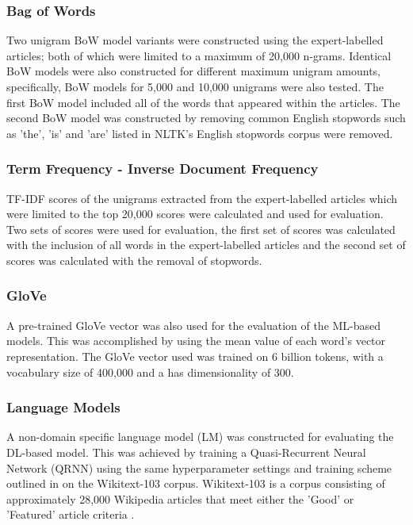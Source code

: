 \documentclass[a4paper,twoside,phd]{BYUPhys}
\begin{document}
\subsubsection{Bag of Words}
\label{sec:FeatureSelectionBoW}
Two unigram BoW model variants were constructed using the expert-labelled articles; both of which were limited to a maximum of 20,000 n-grams. Identical BoW models were also constructed for different maximum unigram amounts, specifically, BoW models for 5,000 and 10,000 unigrams were also tested. The first BoW model included all of the words that appeared within the articles. The second BoW model was constructed by removing common English stopwords such as 'the', 'is' and 'are' listed in NLTK's English stopwords corpus \cite{Bird2009} were removed.

\subsubsection{Term Frequency - Inverse Document Frequency}
\label{sec:FeatureSelectionTFIDF}
TF-IDF scores of the unigrams extracted from the expert-labelled articles which were limited to the top 20,000 scores were calculated and used for evaluation. Two sets of scores were used for evaluation, the first set of scores was calculated with the inclusion of all words in the expert-labelled articles and the second set of scores was calculated with the removal of stopwords.

\subsubsection{GloVe}
\label{sec:FeatureSelectionGloVe}

A pre-trained GloVe vector \cite{pennington2014glove} was also used for the evaluation of the ML-based models. This was accomplished by using the mean value of each word's vector representation. The GloVe vector used was trained on 6 billion tokens, with a vocabulary size of 400,000 and a has dimensionality of 300.

\subsubsection{Language Models}
\label{sec:FeatureSelectionLM}

A non-domain specific language model (LM) was constructed for evaluating the DL-based model. This was achieved by training a Quasi-Recurrent Neural Network (QRNN) using the same hyperparameter settings and training scheme outlined in \cite{bradbury2016quasi} on the Wikitext-103 corpus. Wikitext-103 is a corpus consisting of approximately 28,000 Wikipedia articles that meet either the 'Good' or 'Featured' article criteria \cite{Merity2016}. \newline
\end{document}
